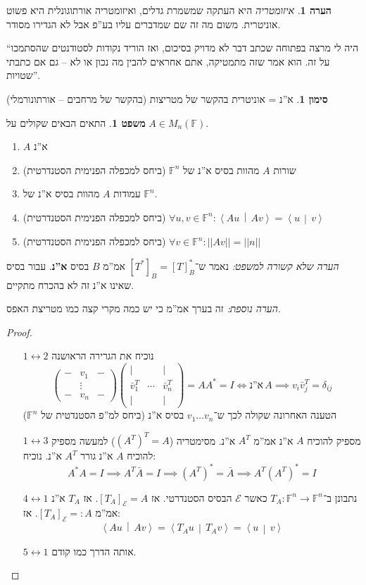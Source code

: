 \documentclass[a4paper]{article}
\newcommand\ec    {\mathcal{E}}
\newcommand\ra    {\rangle}
\newcommand\la    {\langle}
\newcommand\lra       {\leftrightarrow}
\newcommand\F         {\mathbb{F}}
\newcommand\co        {\colon}
\newcommand\pms[1]    {\begin{pmatrix}
		#1
\end{pmatrix}}
\newcommand\norm[1]   {\left \vert \left \vert #1 \right \vert \right \vert}
\newcommand\mut [2]   {\left \la #1 \,\middle\vert\, #2 \right \ra}
\newcommand\dg        {\delta}
\theoremstyle{definition}
\newtheorem{Theorem}{משפט}
\newtheorem{Remark}{הערה}
\newtheorem{Notion}{סימון}
\newcommand\theo  [1] {\begin{Theorem}#1\end{Theorem}}
\newcommand\rmark [1] {\begin{Remark}#1\end{Remark}}
\newcommand\noti  [1] {\begin{Notion}#1\end{Notion}}
\begin{document}
	
	\rmark{\textit{איזומטריה} היא העתקה שמשמרת גדלים, ואיזומטריה אורתוגונלית היא פשוט אוניטרית. משום מה זה שם שמדברים עליו בע''פ אבל לא הגדירו מסודר. }
	
	``היה לי מרצה בפתוחה שכתב דבר לא מדויק בסיכום, ואז הוריד נקודות לסטודנטים שהסתמכו על זה. הוא אמר שזה מתמטיקה, אתם אחראים להבין מה נכון או לא – גם אם כתבתי שטויות''. 
	
	\noti{א''נ = אוניטרית בהקשר של מטריצות (בהקשר של מרחבים – אורתונורמלי)}
	
	\theo{התאים הבאים שקולים על $A \in M_n(\F)$. 
		\begin{enumerate}
			\item $A$ א''נ
			\item שורות $A$ מהוות בסיס א''נ של $\F^n$ (ביחס למכפלה הפנימית הסטנדרטית)
			\item עמודות $A$ מהוות בסיס א''נ של $\F^n$. 
			\item (ביחס למכפלה הפנימית הסטנדרטית) \hfill $\forall u, v \in \F^n \co \mut{Au}{Av} = \mut{u}{v}$
			\item (ביחס למכפלה הפנימית הסטנדרטית) \hfill $\forall v \in \F^n \co \norm{Av} = \norm{n}$
	\end{enumerate}}
	\textit{הערה שלא קשורה למשפט: }נאמר ש־$[T^*]_B = [T]_B^*$ אמ''מ $B$ בסיס \textbf{א''נ}. עבור בסיס שאינו א''נ זה לא בהכרח מתקיים. 
	
	\textit{הערה נוספת: }זה בערך אמ''מ כי יש כמה מקרי קצה כמו מטריצת האפס. 
	
	\begin{proof}\,
		\begin{itemize}
			\item[$1 \lra 2$] נוכיח את הגרירה הראושנה
			\[ \pms{- & v_1 & - \\ & \vdots \\ - & v_n & -}\pms{\vert & & \vert\\ \bar v_1^T & \cdots & \bar v_n^T \\ \vert & & \vert} = AA^* = I \iff \text{א''נ}\, A \implies v_i \bar v_j^T = \dg_{ij} \] 
			הטענה האחרונה שקולה לכך ש־$v_1 \dots v_n$ בסיס א''נ (ביחס למ''פ הסטנדטית של $\F^n$)
			\item[$1 \lra 3$]מספיק להוכיח $A$ א''נ אמ''מ $A^T$ א''נ. מסימטריה ($(A^T)^T = A$) למעשה מספיק להוכיח $A$ א''נ גורר $A^T$ א''נ. נוכיח: 
			\[ A^*A = I \implies A^T\bar A = I \implies (A^T)^* = \bar A \implies A^T(A^T)^* = I \]
			\item[$4 \lra 1$]נתבונן ב־$T_A \co \F^n \to \F^n$ כאשר $\ec$ הבסיס הסטנדרטי. אז $[T_A]_{\ec} = A$. אז $T_A$ א''נ אמ''מ $[T_A]_{\ec} =: A$. אז: 
			\[ \mut{Au}{Av} = \mut{T_Au}{T_Av} = \mut{u}{v} \]
			\item[$5 \lra 1$] אותה הדרך כמו קודם. 
		\end{itemize}
	\end{proof}
	
\end{document}
